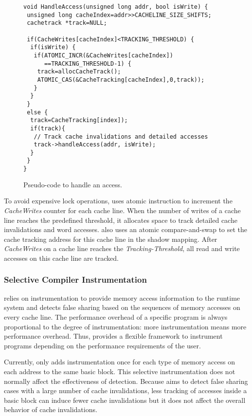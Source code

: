 \begin{figure}[!t]
\begin{lstlisting}
void HandleAccess(unsigned long addr, bool isWrite) {
 unsigned long cacheIndex=addr>>CACHELINE_SIZE_SHIFTS;
 cachetrack *track=NULL;

 if(CacheWrites[cacheIndex]<TRACKING_THRESHOLD) {
  if(isWrite) {
   if(ATOMIC_INCR(&CacheWrites[cacheIndex]) 
      ==TRACKING_THRESHOLD-1) {
    track=allocCacheTrack();
    ATOMIC_CAS(&CacheTracking[cacheIndex],0,track));
   }
  } 
 }
 else {
  track=CacheTracking[index]);
  if(track){
   // Track cache invalidations and detailed accesses
   track->handleAccess(addr, isWrite);
  }
 }
}
\end{lstlisting}
\caption{Pseudo-code to handle an access.\label{fig:algorithm}}
\end{figure}

To avoid expensive lock operations, \Predator{} uses atomic instruction to increment 
the {\it CacheWrites} counter for each cache line. 
When the number of writes of a cache line reaches the predefined threshold,
it allocates space to track detailed cache invalidations and word accesses.
\Predator{} also 
uses an atomic compare-and-swap to set the cache tracking address for this cache line in
the shadow mapping.
After {\it CacheWrites} on a cache line reaches the {\it Tracking-Threshold}, 
all read and write accesses on this cache line are tracked.


\subsubsection{Selective Compiler Instrumentation}

\Predator{} relies on instrumentation to provide memory access information to the runtime system 
and detects false sharing based on the sequences of memory accesses on every cache line. 
The performance overhead of a specific program is always proportional to 
the degree of instrumentation: more 
instrumentation means more performance overhead. 
Thus, \Predator{} provides a flexible framework to instrument programs 
depending on the performance requirements of the user.

Currently, \Predator{} only adds instrumentation once for each type of memory access on each address 
to the same basic block. 
This selective instrumentation does not normally affect the effectiveness of detection. 
Because \Predator{} aims to detect false sharing cases with a large number of cache invalidations,
less tracking of accesses inside a basic block can induce fewer cache invalidations 
but it does not affect the overall behavior of cache invalidations. 

